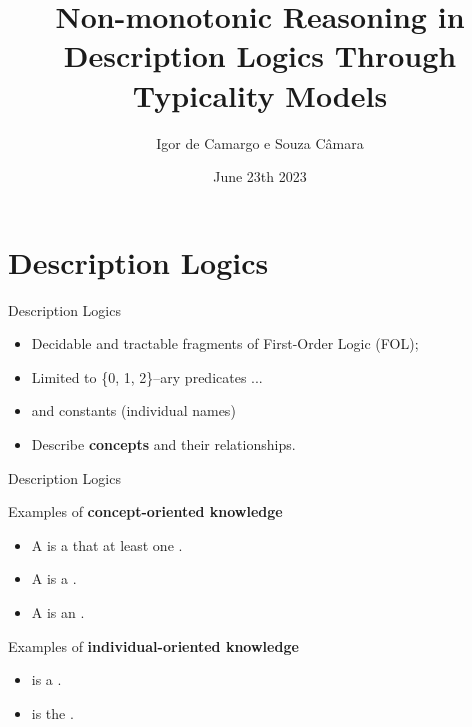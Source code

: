 \documentclass[10pt]{beamer}
\title{Non-monotonic Reasoning in Description Logics Through Typicality Models}
\date{June 23th 2023}
\author{Igor de Camargo e Souza Câmara}
\institute{University of São Paulo}
\begin{document}
\begin{frame}[plain]
  \titlepage
\end{frame}


%
%

\section{Description Logics}

\begin{frame}[fragile]{Description Logics}
  \begin{itemize}
    \item Decidable and tractable fragments of First-Order Logic (FOL); \pause
    \item Limited to \{0, 1, 2\}--ary predicates ... 
    \item and constants (individual names) \pause 
    \item Describe \textbf{concepts} and their relationships.
  \end{itemize}
\end{frame}

\begin{frame}[fragile]{Description Logics}

Examples of \textbf{concept-oriented knowledge}

\begin{itemize}
  \item A  is a  that  at least one .
  \item A  is a   .
  \item A  is an  .
\end{itemize}

\medskip
\pause
Examples of \textbf{individual-oriented knowledge}

\begin{itemize}
  \item {} is a .
  \item {} is the  .
\end{itemize}

\end{frame}
\end{document}
